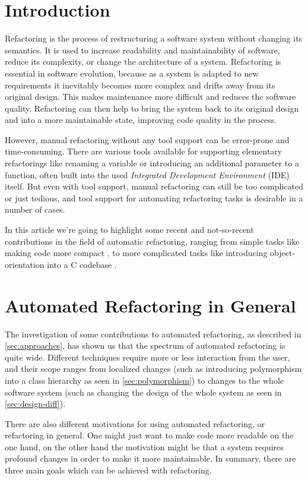 \documentclass[conference,compsoc,a4paper]{IEEEtran}
\begin{document}
\section{Introduction}

Refactoring is the process of restructuring a software system without changing its semantics. It is used to increase 
readability and maintainability of software, reduce its complexity, or change the architecture of a system. Refactoring 
is essential in software evolution, because as a system is adapted to new requirements it inevitably becomes more 
complex and drifts away from its original design. This makes maintenance more difficult and reduces the software 
quality. Refactoring can then help to bring the system back to its original design and into a more maintainable state, 
improving code quality in the process.

However, manual refactoring without any tool support can be error-prone and time-consuming. There are various tools 
available for supporting elementary refactorings like renaming a variable or introducing an additional parameter to a 
function, often built into the used \emph{Integrated Development Environment} (IDE) itself. But even with tool support, 
manual refactoring can still be too complicated or just tedious, and tool support for automating refactoring tasks is 
desirable in a number of cases.

In this article we're going to highlight some recent and not-so-recent contributions in the field of automatic 
refactoring, ranging from simple tasks like making code more compact \cite{sparta}, to more complicated tasks like 
introducing object-orientation into a C codebase \cite{cpp}.

\section{Automated Refactoring in General}\label{sec:general}

The investigation of some contributions to automated refactoring, as described in \autoref{sec:approaches}, has shown us that the spectrum of automated refactoring is quite wide. Different 
techniques require more or less interaction from the user, and their scope ranges from localized changes (such as 
introducing polymorphism into a class hierarchy as seen in \autoref{sec:polymorphism}) to changes to the whole software 
system (such as changing the design of the whole system as seen in \autoref{sec:design-diff}).

There are also different motivations for using automated refactoring, or refactoring in general. One might just want to 
make code more readable on the one hand, on the other hand the motivation might be that a system requires profound 
changes in order to make it more maintainable. In summary, there are three main goals which can be achieved with refactoring.
\end{document}
